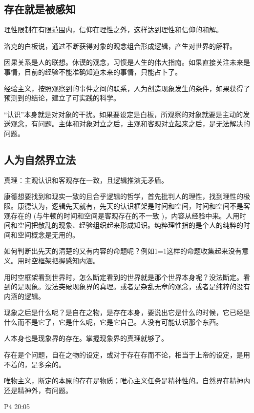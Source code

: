 \documentclass[UTF8]{../RepresentationUniverse}
\begin{document}
\subsection{存在就是被感知}

理性限制在有限范围内，信仰在理性之外，这样达到理性和信仰的和解。

洛克的白板说，通过不断获得对象的观念组合形成逻辑，产生对世界的解释。

因果关系是人的联想。休谟的观念，习惯是人生的伟大指南。如果直接关注未来是事情，目前的经验不能准确知道未来的事情，只能占卜了。

经验主义，按照观察到的事件之间的联系，人为创造现象发生的条件，如果获得了预测到的结论，建立了可实践的科学。

“认识”本身就是对对象的干扰。如果要设定是白板，所观察的对象就要是主动的发送观念，有问题。主体和对象对立之后，主观和客观对立起来之后，是无法解决的问题。

\subsection{人为自然界立法}



真理：主观认识和客观存在一致，且逻辑推演无矛盾。

康德想要找到和现实一致的且合乎逻辑的哲学，首先批判人的理性，找到理性的极限。康德认为，逻辑先天就有，先天的认识框架是时间和空间，时间和空间不是客观存在的 (与牛顿的时间和空间是客观存在的不一致 )，内容从经验中来。人用时间和空间把散乱的现象、经验组织起来形成知识。纯粹理性指的是个人的纯粹的时间和空间概念是无用的。

如何判断出先天的清楚的又有内容的命题呢？例如1=1这样的命题收集起来没有意义。用时空框架把握感知内涵。

用时空框架看到世界时，怎么断定看到的世界就是那个世界本身呢？没法断定。看到的是现象。没法突破现象界的真理。或者是杂乱无章的观念，或者是纯粹的没有内涵的逻辑。

现象之后是什么呢？是自在之物，是存在本身，要说出它是什么的时候，它已经是什么而不是它了，它是什么呢，它是它自己。人没有可能认识那个东西。

人本身也是现象界的存在。掌握现象界的真理就够了。

存在是个问题，自在之物的设定，或对于存在存而不论，相当于上帝的设定，是用不着的，是多余的。


唯物主义，断定的本原的存在是物质；唯心主义任务是精神性的。自然界在精神内还是精神外，有问题。

P4 20:05
\end{document}
